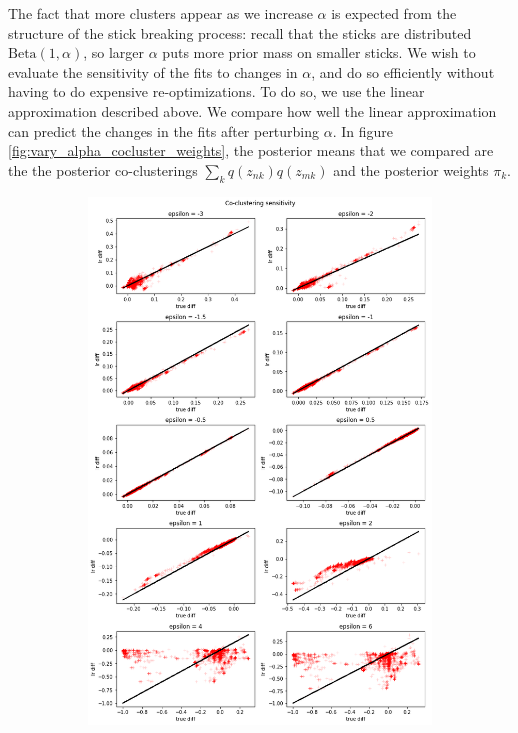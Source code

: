 \documentclass[a4paper]{article}
\begin{document}
The fact that more clusters appear as we increase $\alpha$ is expected from the structure
of the stick breaking process: recall that the sticks are distributed $\text{Beta}(1, \alpha)$,
so larger $\alpha$ puts more prior mass on smaller sticks. We wish to evaluate the
sensitivity of the fits to changes in $\alpha$, and do so efficiently without having to
do expensive re-optimizations. To do so, we use the linear approximation described
above. We compare how well the linear approximation can predict the changes in the fits after perturbing $\alpha$.
In figure \ref{fig:vary_alpha_cocluster_weights}, the posterior means that we compared
are the the posterior co-clusterings $\sum_{k} q(z_{nk})q(z_{mk})$ and the posterior weights $\pi_k$.

\begin{figure}[h!]
	\centering
	\begin{subfigure}[t]{0.45\textwidth}
		\includegraphics[width = \textwidth]{./parametric_sensitivity_figs/cocluster_sensitivity.png}

\end{subfigure}
\end{figure}
\end{document}

